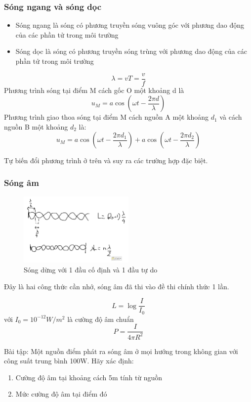 \subsubsection{Sóng ngang và sóng dọc}
\begin{itemize}
    \item Sóng ngang là sóng có phương truyền sóng vuông góc với phương dao động của các phần tử trong môi trường
    \item Sóng dọc là sóng có phương truyền sóng trùng với phương dao động của các phần tử trong môi trường
\end{itemize}
\begin{tcolorbox}
    $$\lambda=vT=\frac{v}{f}$$
Phương trình sóng tại điểm M cách gốc O một khoảng d là
$$u_{M}=a\cos{(\omega t-\frac{2\pi d}{\lambda})}$$
Phương trình giao thoa sóng tại điểm M cách nguồn A một khoảng $d_{1}$ và cách nguồn B một khoảng $d_{2}$ là:
$$u_{M}=a\cos(\omega t-\frac{2\pi d_{1}}{\lambda})+a\cos(\omega t-\frac{2\pi d_{2}}{\lambda})$$
\end{tcolorbox}
Tự biến đổi phương trình ở trên và suy ra các trường hợp đặc biệt.
\subsubsection{Sóng âm}
\begin{figure}
    \centering
    \includegraphics[width=0.5\textwidth]{song1.png}
    \caption{Sóng dừng với 1 đầu cố định và 1 đầu tự do}
    \label{song}
\end{figure}
Đây là hai công thức cần nhớ, sóng âm đã thi vào đề thi chính thức 1 lần.
\begin{tcolorbox}
    $$L=\log{\frac{I}{I_{0}}}$$ với $I_{0}=10^{-12}W/m^2$ là cường độ âm chuẩn
    $$P=\frac{I}{4\pi R^2}$$
\end{tcolorbox}
Bài tập: Một nguồn điểm phát ra sóng âm ở mọi hướng trong không gian với công suất trung bình 100W. Hãy xác định:
\begin{enumerate}
    \item Cường độ âm tại khoảng cách 5m tính từ nguồn
    \item Mức cường độ âm tại điểm đó
\end{enumerate}
